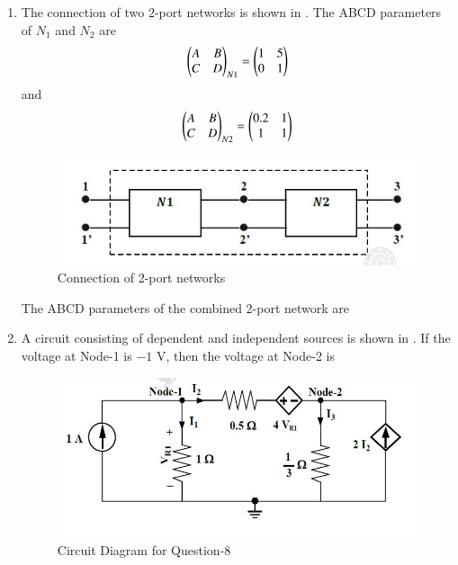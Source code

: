 \documentclass[journal,12pt,onecolumn]{IEEEtran}
\theoremstyle{remark}
\begin{document}
\begin{enumerate}
\item The connection of two $2$-port networks is shown in . The ABCD parameters of $N_1$ and $N_2$ are 
$$\begin{pmatrix}A & B \\ C & D\end{pmatrix}_{N1} = \begin{pmatrix}1 & 5 \\ 0 & 1\end{pmatrix}$$ and $$\begin{pmatrix}A & B \\ C & D\end{pmatrix}_{N2} = \begin{pmatrix}0.2 & 1 \\ 1 & 1\end{pmatrix}$$
\begin{figure}[H]
    \centering
    \includegraphics[width=0.5\columnwidth]{Figs/Q-7.png}
    \caption{Connection of 2-port networks}
    \label{fig:placeholder_3}
\end{figure}
The ABCD parameters of the combined 2-port network are \par \hfill{}
\begin{enumerate}
\end{enumerate}

\item A circuit consisting of dependent and independent sources is shown in . If the voltage at Node-1 is $-1$ V, then the voltage at Node-2 is \textemdash \textemdash {} 
\par \hfill{}
\begin{figure}[H]
    \centering
    \includegraphics[width=0.6\columnwidth]{Figs/Q-8.png}
    \caption{Circuit Diagram for Question-8}
    \label{fig:placeholder_4}
\end{figure}



\end{enumerate}
\end{document}
